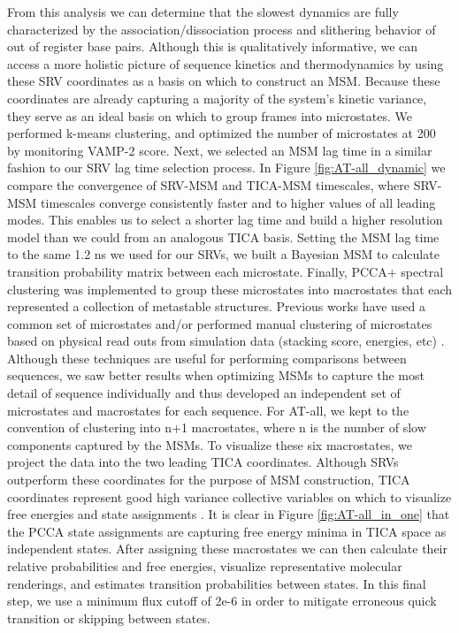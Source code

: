 \documentclass[journal=jpcbfk,manuscript=article]{achemso}
\begin{document}
From this analysis we can determine that the slowest dynamics are fully characterized by the association/dissociation process and slithering behavior of out of register base pairs. Although this is qualitatively informative, we can access a more holistic picture of sequence kinetics and thermodynamics by using these SRV coordinates as a basis on which to construct an MSM. Because these coordinates are already capturing a majority of the system's kinetic variance, they serve as an ideal basis on which to group frames into microstates. We performed k-means clustering, and optimized the number of microstates at 200 by monitoring VAMP-2 score. Next, we selected an MSM lag time in a similar fashion to our SRV lag time selection process. In Figure \ref{fig:AT-all_dynamic} we compare the convergence of SRV-MSM and TICA-MSM timescales, where SRV-MSM timescales converge consistently faster and to higher values of all leading modes. This enables us to select a shorter lag time and build a higher resolution model than we could from an analogous TICA basis. Setting the MSM lag time to the same 1.2 ns we used for our SRVs, we built a Bayesian MSM to calculate transition probability matrix between each microstate. Finally, PCCA+ spectral clustering was implemented to group these microstates into macrostates that each represented a collection of metastable structures. Previous works have used a common set of microstates and/or performed manual clustering of microstates based on physical read outs from simulation data (stacking score, energies, etc) \citep{Pinamonti2017PredictingModels, PinamontiTheModels}. Although these techniques are useful for performing comparisons between sequences, we saw better results when optimizing MSMs to capture the most detail of sequence individually and thus developed an independent set of microstates and macrostates for each sequence. For AT-all, we kept to the convention of clustering into n+1 macrostates, where n is the number of slow components captured by the MSMs. To visualize these six macrostates, we project the data into the two leading TICA coordinates. Although SRVs outperform these coordinates for the purpose of MSM construction, TICA coordinates represent good high variance collective variables on which to visualize free energies and state assignments \citep{Sidky}. It is clear in Figure \ref{fig:AT-all_in_one} that the PCCA state assignments are capturing free energy minima in TICA space as independent states. After assigning these macrostates we can then calculate their relative probabilities and free energies, visualize representative molecular renderings, and estimates transition probabilities between states. In this final step, we use a minimum flux cutoff of 2e-6 in order to mitigate erroneous quick transition or skipping between states. 
\end{document}
